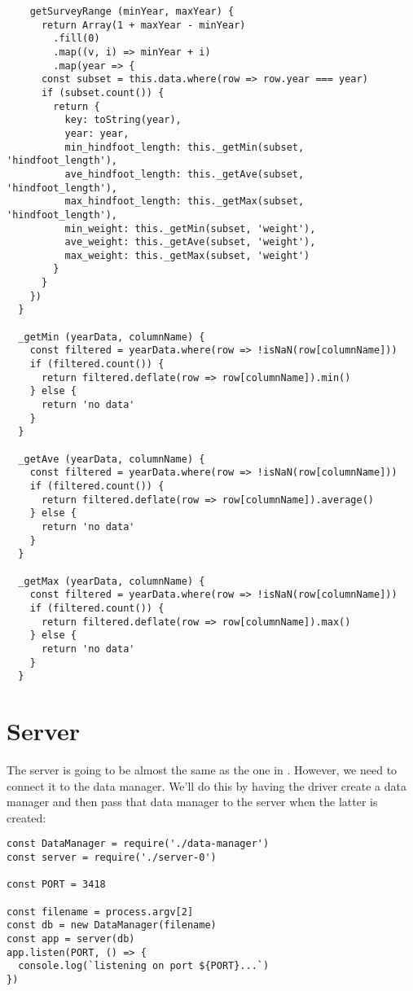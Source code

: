\begin{verbatim}
    getSurveyRange (minYear, maxYear) {
      return Array(1 + maxYear - minYear)
        .fill(0)
        .map((v, i) => minYear + i)
        .map(year => {
      const subset = this.data.where(row => row.year === year)
      if (subset.count()) {
        return {
          key: toString(year),
          year: year,
          min_hindfoot_length: this._getMin(subset, 'hindfoot_length'),
          ave_hindfoot_length: this._getAve(subset, 'hindfoot_length'),
          max_hindfoot_length: this._getMax(subset, 'hindfoot_length'),
          min_weight: this._getMin(subset, 'weight'),
          ave_weight: this._getAve(subset, 'weight'),
          max_weight: this._getMax(subset, 'weight')
        }
      }
    })
  }

  _getMin (yearData, columnName) {
    const filtered = yearData.where(row => !isNaN(row[columnName]))
    if (filtered.count()) {
      return filtered.deflate(row => row[columnName]).min()
    } else {
      return 'no data'
    }
  }

  _getAve (yearData, columnName) {
    const filtered = yearData.where(row => !isNaN(row[columnName]))
    if (filtered.count()) {
      return filtered.deflate(row => row[columnName]).average()
    } else {
      return 'no data'
    }
  }

  _getMax (yearData, columnName) {
    const filtered = yearData.where(row => !isNaN(row[columnName]))
    if (filtered.count()) {
      return filtered.deflate(row => row[columnName]).max()
    } else {
      return 'no data'
    }
  }
\end{verbatim}

\section{Server}\label{s:capstone-server}

The server is going to be almost the same as the one in .
However, we need to connect it to the data manager.
We'll do this by having the driver create a data manager
and then pass that data manager to the server when the latter is created:

\begin{verbatim}
const DataManager = require('./data-manager')
const server = require('./server-0')

const PORT = 3418

const filename = process.argv[2]
const db = new DataManager(filename)
const app = server(db)
app.listen(PORT, () => {
  console.log(`listening on port ${PORT}...`)
})
\end{verbatim}

